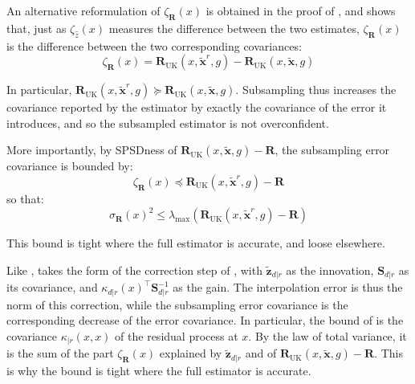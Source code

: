 \begin{remark}\label{th:variance_difference}
	An alternative reformulation of $\zeta_{\mathbf{R}}(x)$ is obtained in the proof of , and shows that, just as $\zeta_{\hat{z}}(x)$ measures the difference between the two estimates, $\zeta_{\mathbf{R}}(x)$ is the difference between the two corresponding covariances:
	\begin{equation}
		\zeta_{\mathbf{R}}(x)=\mathbf{R}_{\mathrm{UK}}(x,\tilde{\mathbf{x}}^r,g)-\mathbf{R}_{\mathrm{UK}}(x,\tilde{\mathbf{x}},g)
	\end{equation}

	In particular, $\mathbf{R}_{\mathrm{UK}}(x,\tilde{\mathbf{x}}^r,g)\succeq \mathbf{R}_{\mathrm{UK}}(x,\tilde{\mathbf{x}},g)$. Subsampling thus increases the covariance reported by the estimator by exactly the covariance of the error it introduces, and so the subsampled estimator is not overconfident.

	More importantly, by SPSDness of $\mathbf{R}_{\mathrm{UK}}(x,\tilde{\mathbf{x}},g)-\mathbf{R}$, the subsampling error covariance is bounded by:
	\begin{equation}
		\zeta_{\mathbf{R}}(x)\preceq \mathbf{R}_{\mathrm{UK}}(x,\tilde{\mathbf{x}}^r,g)-\mathbf{R}
	\end{equation}
	so that:
	\begin{equation}
		\sigma_{\mathbf{R}}(x)^2\leq\lambda_{\max}\left(\mathbf{R}_{\mathrm{UK}}(x,\tilde{\mathbf{x}}^r,g)-\mathbf{R}\right)
	\end{equation}

	This bound is tight where the full estimator is accurate, and loose elsewhere.
\end{remark}

Like ,  takes the form of the correction step of , with $\tilde{\mathbf{z}}_{d|r}$ as the innovation, $\mathbf{S}_{d|r}$ as its covariance, and $\kappa_{d|r}(x)^\top \mathbf{S}_{d|r}^{-1}$ as the gain. The interpolation error is thus the norm of this correction, while the subsampling error covariance is the corresponding decrease of the error covariance. In particular, the bound of  is the covariance $\kappa_{|r}(x,x)$ of the residual process at $x$. By the law of total variance, it is the sum of the part $\zeta_{\mathbf{R}}(x)$ explained by $\tilde{\mathbf{z}}_{d|r}$ and of $\mathbf{R}_{\mathrm{UK}}(x,\tilde{\mathbf{x}},g)-\mathbf{R}$. This is why the bound is tight where the full estimator is accurate.

